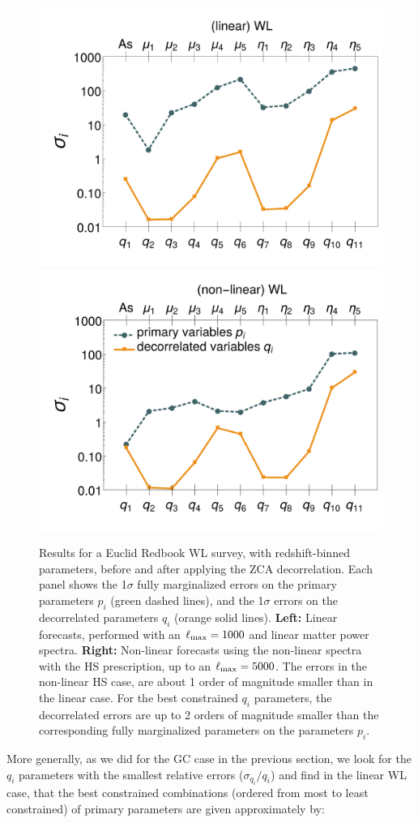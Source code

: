 \begin{figure}[htbp]
	\centering{}\begin{center}
		\includegraphics[width=0.4\linewidth]{Chapters/linear-nonlinear-MG-forecasts/figures/Decorrelations-WL/Errors_at_par_index_i--_ZCA_SquareNorm--fiducialMGBin3_Euclid_WL_linearPK_}
		\includegraphics[width=0.4\linewidth]{Chapters/linear-nonlinear-MG-forecasts/figures/Decorrelations-WL/Errors_at_par_index_i--_ZCA_SquareNorm--fiducialMGBin3_Euclid_WL_nonlinearPk__Zhao_}
	\end{center}
	\caption[1$\sigma$ forecasted errors on the primary and decorrelated parameters for Euclid WL.]{\label{fig:WLbinerrs} 
	Results for a Euclid Redbook WL survey, with redshift-binned parameters, 
	before and after applying the ZCA decorrelation.
	Each panel shows the 1$\sigma$ fully marginalized errors on the primary parameters $p_i$ (green dashed
		lines), and the 1$\sigma$ errors on the decorrelated
		parameters $q_i$ (orange solid lines). \textbf{Left: }Linear forecasts,
		performed with an $\ell_{\rm max}=1000$ and linear matter power spectra.
		\textbf{Right: }Non-linear forecasts using the non-linear spectra with the HS prescription, up to an $\ell_{\rm max}=5000$.
		The errors in the non-linear HS case, are about 1 order of magnitude smaller than in the linear case. 
		For the best constrained $q_i$ parameters, the 
		decorrelated errors are up to 2 orders of magnitude smaller than the corresponding fully marginalized parameters on the parameters $p_i$.}
\end{figure}


More generally, as we did for the GC case in the previous section, we look for the $q_i$ 
parameters with the smallest relative errors ($\sigma_{q_i}/q_i$) and find in the linear WL case, that the best 
constrained combinations (ordered from most to least constrained) of primary parameters are given approximately by: 

